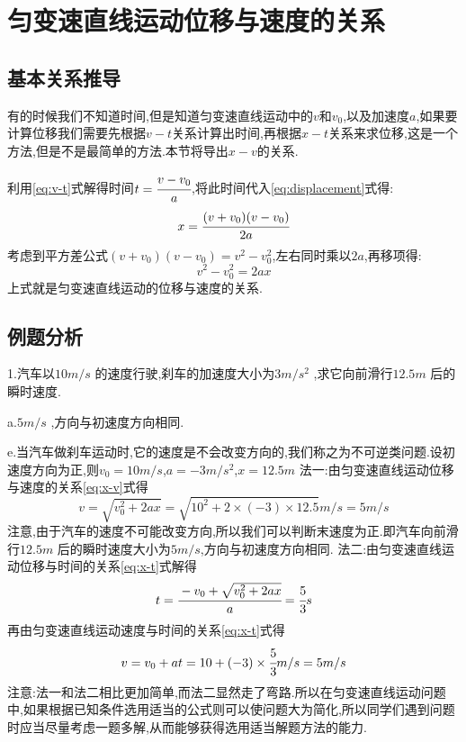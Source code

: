 \section{匀变速直线运动位移与速度的关系}
\subsection{基本关系推导}

有的时候我们不知道时间,但是知道匀变速直线运动中的$v$和$v_0$,以及加速度$a$,如果要计算位移我们需要先根据$v-t$关系计算出时间,再根据$x-t$关系来求位移,这是一个方法,但是不是最简单的方法.本节将导出$x-v$的关系.

利用\eqref{eq:v-t}式解得时间$t=\cfrac{v-v_0}{a}$,将此时间代入\eqref{eq:displacement}式得:
\begin{equation*}
x=\cfrac{(v+v_0)(v-v_0)}{2a}
\end{equation*}
考虑到平方差公式$(v+v_0)(v-v_0)=v^2-v_0^2$,左右同时乘以$2a$,再移项得:
\begin{equation}
v^2-v_0^2=2ax
  \label{eq:x-v}
\end{equation}
上式就是匀变速直线运动的位移与速度的关系.

\subsection{例题分析}
\begin{calculate}
  1.汽车以$10m/s$ 的速度行驶,刹车的加速度大小为$3m/s^2$ ,求它向前滑行$12.5m$ 后的瞬时速度.

  a.$5m/s$ ,方向与初速度方向相同.

  e.当汽车做刹车运动时,它的速度是不会改变方向的,我们称之为不可逆类问题.设初速度方向为正,则$v_0=10m/s$,$a=-3m/s^2$,$x=12.5m$
  \newline
  法一:由匀变速直线运动位移与速度的关系\eqref{eq:x-v}式得
  $$v=\sqrt{v_0^2+2ax}=\sqrt{10^2+2\times(-3)\times12.5}m/s=5m/s$$
  注意,由于汽车的速度不可能改变方向,所以我们可以判断末速度为正.即汽车向前滑行$12.5m$ 后的瞬时速度大小为$5m/s$,方向与初速度方向相同.
  \newline
  法二:由匀变速直线运动位移与时间的关系\eqref{eq:x-t}式解得
  $$t=\cfrac{-v_0+\sqrt{v_0^2+2ax}}{a}=\cfrac{5}{3}s$$
  再由匀变速直线运动速度与时间的关系\eqref{eq:x-t}式得
  $$v=v_0+at=10+(-3)\times\cfrac{5}{3}m/s=5m/s$$
  \newline
  注意:法一和法二相比更加简单,而法二显然走了弯路.所以在匀变速直线运动问题中,如果根据已知条件选用适当的公式则可以使问题大为简化,所以同学们遇到问题时应当尽量考虑一题多解,从而能够获得选用适当解题方法的能力.

\end{calculate}

